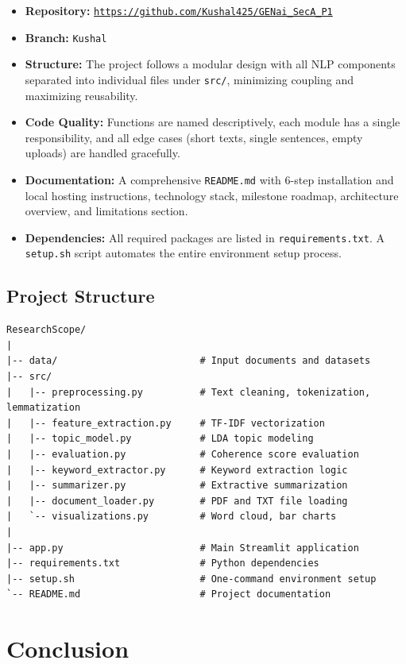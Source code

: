 \documentclass[12pt, a4paper]{article}
\begin{document}
\begin{itemize}
  \item \textbf{Repository:} \href{https://github.com/Kushal425/GENai_SecA_P1}{\texttt{https://github.com/Kushal425/GENai\_SecA\_P1}}
  \item \textbf{Branch:} \texttt{Kushal}
  \item \textbf{Structure:} The project follows a modular design with all NLP components separated into individual files under \texttt{src/}, minimizing coupling and maximizing reusability.
  \item \textbf{Code Quality:} Functions are named descriptively, each module has a single responsibility, and all edge cases (short texts, single sentences, empty uploads) are handled gracefully.
  \item \textbf{Documentation:} A comprehensive \texttt{README.md} with 6-step installation and local hosting instructions, technology stack, milestone roadmap, architecture overview, and limitations section.
  \item \textbf{Dependencies:} All required packages are listed in \texttt{requirements.txt}. A \texttt{setup.sh} script automates the entire environment setup process.
\end{itemize}

\subsection{Project Structure}
\begin{lstlisting}[language={}]
ResearchScope/
|
|-- data/                         # Input documents and datasets
|-- src/
|   |-- preprocessing.py          # Text cleaning, tokenization, lemmatization
|   |-- feature_extraction.py     # TF-IDF vectorization
|   |-- topic_model.py            # LDA topic modeling
|   |-- evaluation.py             # Coherence score evaluation
|   |-- keyword_extractor.py      # Keyword extraction logic
|   |-- summarizer.py             # Extractive summarization
|   |-- document_loader.py        # PDF and TXT file loading
|   `-- visualizations.py         # Word cloud, bar charts
|
|-- app.py                        # Main Streamlit application
|-- requirements.txt              # Python dependencies
|-- setup.sh                      # One-command environment setup
`-- README.md                     # Project documentation
\end{lstlisting}

\section{Conclusion}
\end{document}
